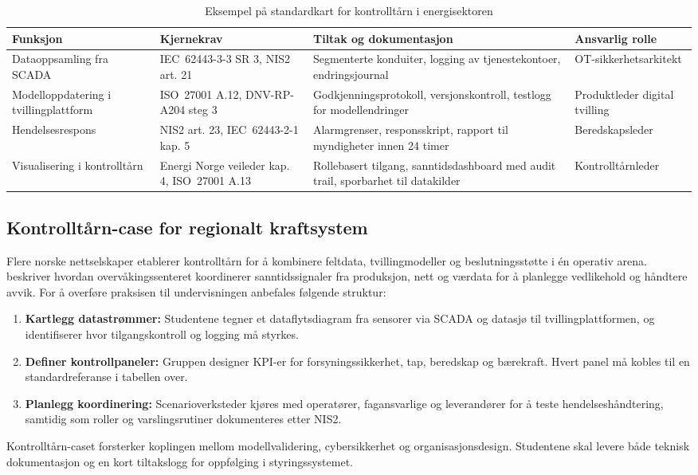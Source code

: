\begin{table}[ht]
    \centering
    \caption{Eksempel på standardkart for kontrolltårn i energisektoren}
    \label{tab:standardkart}
    \begin{tabular}{|p{3.2cm}|p{4.6cm}|p{4.6cm}|p{3.2cm}|}
        \hline
        \textbf{Funksjon} & \textbf{Kjernekrav} & \textbf{Tiltak og dokumentasjon} & \textbf{Ansvarlig rolle} \\
        \hline
        Dataoppsamling fra SCADA & IEC~62443-3-3 SR 3, NIS2 art. 21 & Segmenterte konduiter, logging av tjenestekontoer, endringsjournal & OT-sikkerhetsarkitekt \\
        \hline
        Modelloppdatering i tvillingplattform & ISO~27001 A.12, DNV-RP-A204 steg 3 & Godkjenningsprotokoll, versjonskontroll, testlogg for modellendringer & Produktleder digital tvilling \\
        \hline
        Hendelsesrespons & NIS2 art. 23, IEC~62443-2-1 kap. 5 & Alarmgrenser, responsskript, rapport til myndigheter innen 24 timer & Beredskapsleder \\
        \hline
        Visualisering i kontrolltårn & Energi Norge veileder kap. 4, ISO~27001 A.13 & Rollebasert tilgang, sanntidsdashboard med audit trail, sporbarhet til datakilder & Kontrolltårnleder \\
        \hline
    \end{tabular}
\end{table}

\subsection{Kontrolltårn-case for regionalt kraftsystem}
Flere norske nettselskaper etablerer kontrolltårn for å kombinere feltdata, tvillingmodeller og beslutningsstøtte i én operativ arena. \citet{statnett2024kontrolltarn} beskriver hvordan overvåkingssenteret koordinerer sanntidssignaler fra produksjon, nett og værdata for å planlegge vedlikehold og håndtere avvik. For å overføre praksisen til undervisningen anbefales følgende struktur:
\begin{enumerate}
    \item \textbf{Kartlegg datastrømmer:} Studentene tegner et dataflytsdiagram fra sensorer via SCADA og datasjø til tvillingplattformen, og identifiserer hvor tilgangskontroll og logging må styrkes.
    \item \textbf{Definer kontrollpaneler:} Gruppen designer KPI-er for forsyningssikkerhet, tap, beredskap og bærekraft. Hvert panel må kobles til en standardreferanse i tabellen over.
    \item \textbf{Planlegg koordinering:} Scenarioverksteder kjøres med operatører, fagansvarlige og leverandører for å teste hendelseshåndtering, samtidig som roller og varslingsrutiner dokumenteres etter NIS2.
\end{enumerate}
Kontrolltårn-caset forsterker koplingen mellom modellvalidering, cybersikkerhet og organisasjonsdesign. Studentene skal levere både teknisk dokumentasjon og en kort tiltakslogg for oppfølging i styringssystemet.

